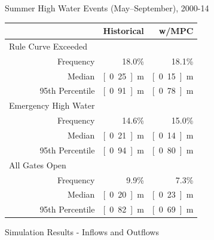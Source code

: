 \documentclass[compress,english]{beamer}
\begin{document}
\begin{frame}{Summer High Water Events (May--September), 2000-14}

\begin{center}	
\begin{tabular}{lrrr}\toprule
\qquad\qquad\qquad\quad & & Historical & w/MPC	\\
\midrule
\multicolumn{2}{l}{Rule Curve Exceeded} & & \\
& Frequency & 18.0\% & 18.1\% \\
& Median & \unit[0.25]{m} & \unit[0.15]{m}\\
& 95th Percentile & \unit[0.91]{m} & \unit[0.78]{m}\\
\midrule
\multicolumn{2}{l}{Emergency High Water} & & \\
& Frequency & 14.6\% & 15.0\%\\
& Median & \unit[0.21]{m} & \unit[0.14]{m} \\
& 95th Percentile & \unit[0.94]{m} & \unit[0.80]{m} \\
\midrule
\multicolumn{2}{l}{All Gates Open} & &\\
& Frequency & 9.9\% & 7.3\% \\
& Median & \unit[0.20]{m} & \unit[0.23]{m}\\
& 95th Percentile & \unit[0.82]{m} & \unit[0.69]{m} \\
\midrule
\end{tabular}
\end{center}

\vspace*{3mm}
\vfill

\end{frame}

\begin{frame}{Simulation Results - Inflows and Outflows}

\vfill
\centering
{}
\vfill

\end{frame}
 
\end{document}
